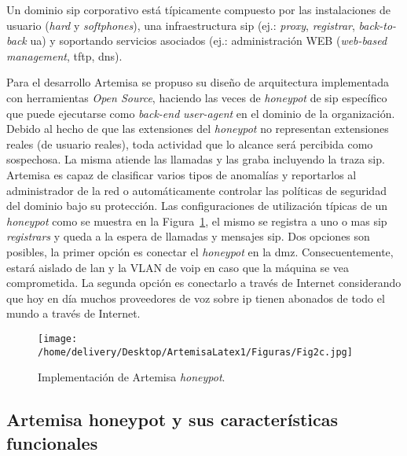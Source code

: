 \documentclass[a4paper,12pt]{report}
\begin{document}
Un dominio \ac{sip} corporativo está típicamente compuesto por las instalaciones de
usuario (\emph{hard} y \emph{softphones}), una infraestructura \ac{sip} (ej.: \emph{proxy}, \emph{registrar},
\emph{back-to-back} \ac{ua}) y soportando servicios asociados (ej.: administración
WEB (\emph{web-based management}, \ac{tftp}, \ac{dns}). 

Para el desarrollo Artemisa se propuso su diseño de arquitectura
implementada con he\-rra\-mien\-tas \emph{Open Source}, haciendo las veces de \emph{honeypot} de
\ac{sip} específico que puede ejecutarse como \emph{back-end} \emph{user-agent} en el dominio de
la organización. Debido al hecho de que las extensiones del \emph{honeypot} no
representan extensiones reales (de usuario reales), toda actividad que lo
alcance será percibida como sospechosa. La misma atiende las llamadas y las
graba incluyendo la traza \ac{sip}. Artemisa es capaz de clasificar varios tipos de
anomalías y reportarlos al ad\-mi\-nis\-tra\-dor de la red o automáticamente controlar
las políticas de seguridad del dominio bajo su protección. Las configuraciones
de utilización típicas de un \emph{honeypot} como se muestra en la Figura~\ref{implentacion_artemisa}, el
mismo se registra a uno o mas \ac{sip} \emph{registrars} y queda a la espera de llamadas y
mensajes \ac{sip}. Dos opciones son posibles, la primer opción es  conectar el
\emph{honeypot} en la \ac{dmz}.
Consecuentemente, estará aislado de \ac{lan} y la VLAN de
\ac{voip} en caso que la máquina se vea comprometida. La segunda opción es
conectarlo a través de Internet considerando que hoy en día muchos proveedores
de voz sobre \ac{ip} tienen abonados de todo el mundo a través de Internet.

\begin{figure}[h!] 
\centering
\texttt{[image: /home/delivery/Desktop/ArtemisaLatex1/Figuras/Fig2c.jpg]}
\caption{Implementación de Artemisa \emph{honeypot}. \cite{docarmof}}
\label{implentacion_artemisa}
\end{figure}

\subsection{Artemisa honeypot y sus características funcionales}
\label{caracteristicas_arte}
\end{document}
